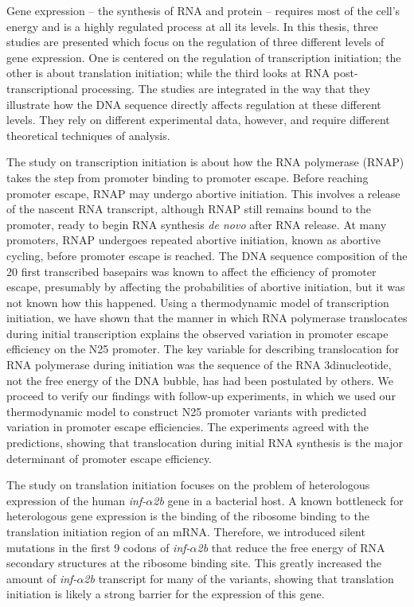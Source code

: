 Gene expression -- the synthesis of RNA and protein -- requires most of the
cell's energy and is a highly regulated process at all its levels. In this
thesis, three studies are presented which focus on the regulation of three
different levels of gene expression. One is centered on the regulation of
transcription initiation; the other is about translation initiation; while the
third looks at RNA post-transcriptional processing. The studies are integrated
in the way that they illustrate how the DNA sequence directly affects
regulation at these different levels. They rely on different experimental data,
however, and require different theoretical techniques of analysis.

The study on transcription initiation is about how the RNA polymerase (RNAP)
takes the step from promoter binding to promoter escape. Before reaching
promoter escape, RNAP may undergo abortive initiation. This involves a release
of the nascent RNA transcript, although RNAP still remains bound to the
promoter, ready to begin RNA synthesis \textit{de novo} after RNA release. At
many promoters, RNAP undergoes repeated abortive initiation, known as abortive
cycling, before promoter escape is reached. The DNA sequence composition of the
20 first transcribed basepairs was known to affect the efficiency of promoter
escape, presumably by affecting the probabilities of abortive initiation, but
it was not known how this happened. Using a thermodynamic model of
transcription initiation, we have shown that the manner in which RNA polymerase
translocates during initial transcription explains the observed variation in
promoter escape efficiency on the N25 promoter. The key variable for describing
translocation for RNA polymerase during initiation was the sequence of the RNA
3\ppp dinucleotide, not the free energy of the DNA bubble, has had been
postulated by others. We proceed to verify our findings with follow-up
experiments, in which we used our thermodynamic model to construct N25 promoter
variants with predicted variation in promoter escape efficiencies. The
experiments agreed with the predictions, showing that translocation during
initial RNA synthesis is the major determinant of promoter escape efficiency.

The study on translation initiation focuses on the problem of heterologous
expression of the human \textit{inf-$\alpha$2b} gene in a bacterial host. A
known bottleneck for heterologous gene expression is the binding of the
ribosome binding to the translation initiation region of an mRNA. Therefore, we
introduced silent mutations in the first 9 codons of \textit{inf-$\alpha$2b}
that reduce the free energy of RNA secondary structures at the ribosome binding
site. This greatly increased the amount of \textit{inf-$\alpha$2b} transcript
for many of the variants, showing that translation initiation is likely a
strong barrier for the expression of this gene.

